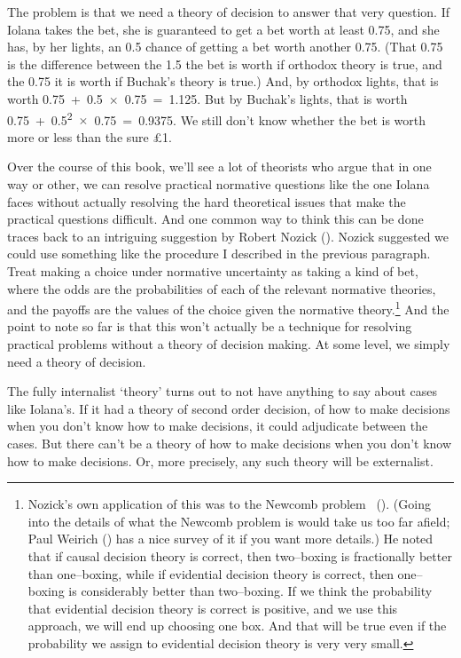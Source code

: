 \documentclass[
  10pt,
  letterpaper,
  twoside]{scrbook}
\begin{document}
The problem is that we need a theory of decision to answer that very
question. If {Iolana} takes the bet, she is guaranteed to get a bet
worth at least 0.75, and she has, by her lights, an 0.5 chance of
getting a bet worth another 0.75. (That 0.75 is the difference between
the 1.5 the bet is worth if orthodox theory is true, and the 0.75 it is
worth if Buchak's theory is true.) And, by orthodox lights, that is
worth 0.75~+~0.5~\(\times\)~0.75~=~1.125. But by Buchak's lights, that
is worth 0.75~+~0.5\textsuperscript{2}~\(\times\)~0.75~=~0.9375. We
still don't know whether the bet is worth more or less than the sure £1.

Over the course of this book, we'll see a lot of theorists who argue
that in one way or other, we can resolve practical normative questions
like the one {Iolana} faces without actually resolving the hard
theoretical issues that make the practical questions difficult. And one
common way to think this can be done traces back to an intriguing
suggestion by Robert Nozick (). Nozick
suggested we could use something like the procedure I described in the
previous paragraph. Treat making a choice under normative uncertainty as
taking a kind of bet, where the odds are the probabilities of each of
the relevant normative theories, and the payoffs are the values of the
choice given the normative theory.\footnote{Nozick's own application of
  this was to the Newcomb problem ~(). (Going into the details of what the Newcomb problem is would
  take us too far afield; Paul Weirich
  () has a nice survey of it if you want
  more details.) He noted that if causal decision theory is correct,
  then two--boxing is fractionally better than one--boxing, while if
  evidential decision theory is correct, then one--boxing is
  considerably better than two--boxing. If we think the probability that
  evidential decision theory is correct is positive, and we use this
  approach, we will end up choosing one box. And that will be true even
  if the probability we assign to evidential decision theory is very
  very small.} And the point to note so far is that this won't actually
be a technique for resolving practical problems without a theory of
decision making. At some level, we simply need a theory of decision.

The fully internalist `theory' turns out to not have anything to say
about cases like {Iolana}'s. If it had a theory of second order
decision, of how to make decisions when you don't know how to make
decisions, it could adjudicate between the cases. But there can't be a
theory of how to make decisions when you don't know how to make
decisions. Or, more precisely, any such theory will be externalist.
\end{document}
